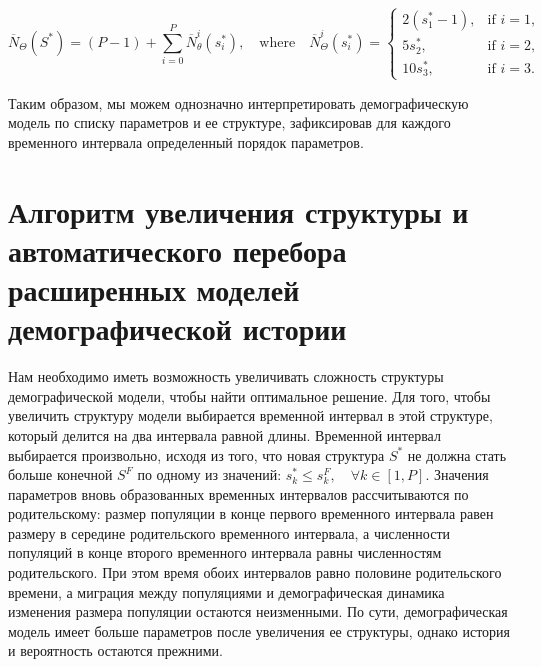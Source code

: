 \begin{equation}\overline{N}_\Theta (S^*) = (P-1)  + \sum_{i = 0}^P{\overline{N}_\theta^i(s^*_i)},\quad 
\text{where} \quad \overline{N}_\Theta^i(s^*_i) = \begin{cases}
        2(s^*_1 - 1), & \text{if } i = 1,\\
        5s^*_2, & \text{if } i = 2,\\
        10s^*_3, & \text{if } i = 3.
        \end{cases}
\end{equation}

Таким образом, мы можем однозначно интерпретировать демографическую модель по списку параметров и ее структуре, зафиксировав для каждого временного интервала определенный порядок параметров.\\

\section{Алгоритм увеличения структуры и автоматического перебора расширенных моделей демографической истории}

Нам необходимо иметь возможность увеличивать сложность структуры демографической модели, чтобы найти оптимальное решение.
Для того, чтобы увеличить структуру модели выбирается временной интервал в этой структуре, который делится на два интервала равной длины.
Временной интервал выбирается произвольно, исходя из того, что новая структура $S^*$ не должна стать больше конечной $S^F$ по одному из значений: $s^*_k \leq s^F_k,\quad \forall k \in [1,P]$.
Значения параметров вновь образованных временных интервалов рассчитываются по родительскому: размер популяции в конце первого временного интервала равен размеру в середине родительского временного интервала, а численности популяций в конце второго временного интервала равны численностям родительского.
При этом время обоих интервалов равно половине родительского времени, а миграция между популяциями и демографическая динамика изменения размера популяции остаются неизменными.
По сути, демографическая модель имеет больше параметров после увеличения ее структуры, однако история и вероятность остаются прежними.

